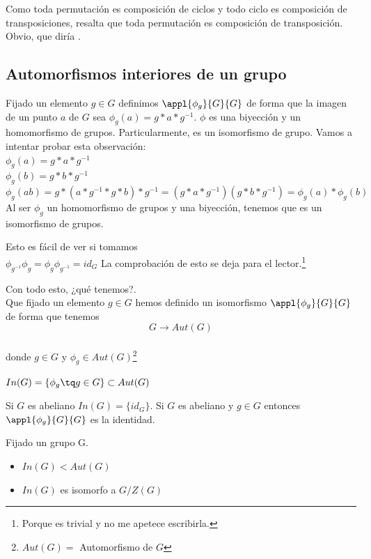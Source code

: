 \documentclass{apuntes}
\begin{document}
\obs Como toda permutación es composición de ciclos y todo ciclo es composición de transposiciones, resalta que toda permutación es composición de transposición. Obvio, que diría \href{http://www.uam.es/personal_pdi/ciencias/dyakubov/dimitry.jpg}{\color{blue}{Dmitry}}.

\subsection{Automorfismos interiores de un grupo}
Fijado un elemento $g\in G$ definimos $\appl{\phi _g}{G}{G}$ de forma que la imagen
de un punto $a$ de $G$ sea $\phi _g(a) = g\ast a \ast g^{-1}$.
\obs $\phi$ es una biyección y un homomorfismo de grupos. Particularmente, es un isomorfismo de grupo.
Vamos a intentar probar esta observación:\\
$\phi _g (a) = g\ast a \ast g^{-1}$\\
$\phi _g (b) = g\ast b \ast g^{-1}$\\
$\phi _g (ab) = g\ast (a\ast g^{-1}\ast g\ast b)\ast g^{-1} = (g\ast a \ast g^{-1})(g\ast b \ast g^{-1}) = \phi _g (a) \ast \phi _g(b)$\\

Al ser $\phi _g$ un homomorfismo de grupos y una biyección, tenemos que es un 
isomorfismo de grupos.

Esto es fácil de ver si tomamos \\
$\phi _{g^{-1}} \phi _g = \phi _g \phi _{g^{-1}} = id_G$
La comprobación de esto se deja para el lector.\footnote{Porque es trivial y no me apetece escribirla.}

Con todo esto, ¿qué tenemos?. \\
Que fijado un elemento $g\in G$ hemos definido un isomorfismo $\appl{\phi _g}{G}{G}$ de forma que tenemos \\
$$G \longrightarrow Aut(G)$$\\
donde $g\in G$ y $\phi _g \in Aut(G)$\footnote{$Aut(G) = $ Automorfismo de $G$}

\begin{defn}[Interior de G]
$In(G) = \{ \phi _g \tq g\in G\} \subset Aut(G)$
\end{defn}

\obs Si $G$ es abeliano $In(G) = \{ id_G \}$. Si $G$ es abeliano y $g\in G$ entonces $\appl{\phi _g}{G}{G}$ es la identidad.

\begin{theorem}
Fijado un grupo G.\\
\begin{itemize}
\item $In(G) < Aut(G)$
\item $In(G)$ es isomorfo a $G/Z(G)$
\end{itemize}
\end{theorem}
\end{document}
